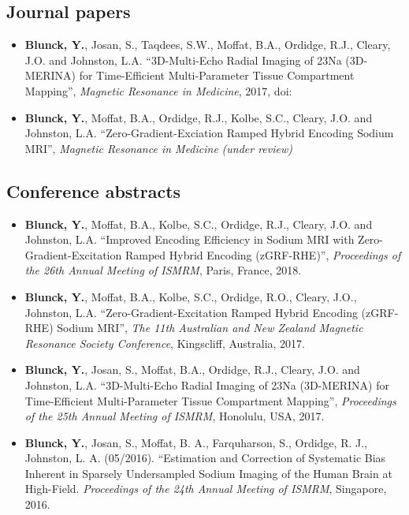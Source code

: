 \documentclass[11pt,a4paper]{book}
\begin{document}
	\subsection*{Journal papers}
	\begin{itemize}
		\item \textbf{Blunck, Y.}, Josan, S., Taqdees, S.W., Moffat, B.A., Ordidge, R.J., Cleary, J.O. and Johnston, L.A. ``3D-Multi-Echo Radial Imaging of 23Na (3D-MERINA) for Time-Efficient Multi-Parameter Tissue Compartment Mapping'', \emph{Magnetic Resonance in Medicine}, 2017, doi:
		
		\item \textbf{Blunck, Y.}, Moffat, B.A., Ordidge, R.J., Kolbe, S.C., Cleary, J.O. and Johnston, L.A. ``Zero-Gradient-Exciation Ramped Hybrid Encoding Sodium MRI'', \emph{Magnetic Resonance in Medicine} \textit{(under review)}
	\end{itemize}
	\subsection*{Conference abstracts}
	\begin{itemize}
		\item \textbf{Blunck, Y.}, Moffat, B.A., Kolbe, S.C., Ordidge, R.J., Cleary, J.O. and Johnston, L.A. ``Improved Encoding Efficiency in Sodium MRI with Zero-Gradient-Excitation Ramped Hybrid Encoding (zGRF-RHE)'', \emph{Proceedings of the 26th Annual Meeting of ISMRM}, Paris, France, 2018.
		
		\item \textbf{Blunck, Y.}, Moffat, B.A., Kolbe, S.C., Ordidge, R.O., Cleary, J.O., Johnston, L.A. ``Zero-Gradient-Excitation Ramped Hybrid Encoding (zGRF-RHE) Sodium MRI'', \emph{The 11th Australian and New Zealand Magnetic Resonance Society Conference}, Kingscliff, Australia, 2017.
		
		\item \textbf{Blunck, Y.}, Josan, S., Moffat, B.A., Ordidge, R.J., Cleary, J.O. and Johnston, L.A. ``3D-Multi-Echo Radial Imaging of 23Na (3D-MERINA) for Time-Efficient Multi-Parameter Tissue Compartment Mapping'', \emph{Proceedings of the 25th Annual Meeting of ISMRM}, Honolulu, USA, 2017.
		
		\item \textbf{Blunck, Y.}, Josan, S., Moffat, B. A., Farquharson, S., Ordidge, R. J., Johnston, L. A. (05/2016). ``Estimation and Correction of Systematic Bias Inherent in Sparsely Undersampled Sodium Imaging of the Human Brain at High-Field. \emph{Proceedings of the 24th Annual Meeting of ISMRM}, Singapore, 2016.
	\end{itemize}
	
\end{document}
